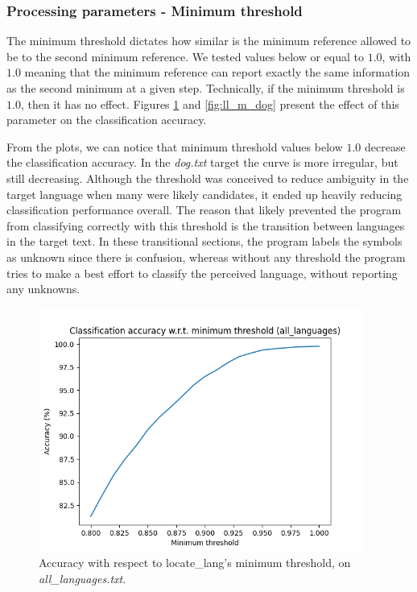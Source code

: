 \documentclass{article}
\begin{document}
\subsubsection{Processing parameters - Minimum threshold}
\label{subsubsec:results_locate_lang_minimum_threshold}

The minimum threshold dictates how similar is the minimum reference allowed to be to the second minimum reference.
We tested values below or equal to $1.0$, with $1.0$ meaning that the minimum reference can report exactly the same information as the second minimum at a given step.
Technically, if the minimum threshold is $1.0$, then it has no effect.
Figures \ref{fig:ll_m_all_languages} and \ref{fig:ll_m_dog} present the effect of this parameter on the classification accuracy.

From the plots, we can notice that minimum threshold values below $1.0$ decrease the classification accuracy.
In the \textit{dog.txt} target the curve is more irregular, but still decreasing.
Although the threshold was conceived to reduce ambiguity in the target language when many were likely candidates, it ended up heavily reducing classification performance overall.
The reason that likely prevented the program from classifying correctly with this threshold is the transition between languages in the target text.
In these transitional sections, the program labels the symbols as unknown since there is confusion, whereas without any threshold the program tries to make a best effort to classify the perceived language, without reporting any unknowns.

\begin{figure}
    \centering
    \includegraphics[width=0.95\textwidth]{../results/ll_all_languages/ll-m.png}
    \caption{Accuracy with respect to locate_lang's minimum threshold, on \textit{all_languages.txt}.}
    \label{fig:ll_m_all_languages}
\end{figure}
\end{document}
